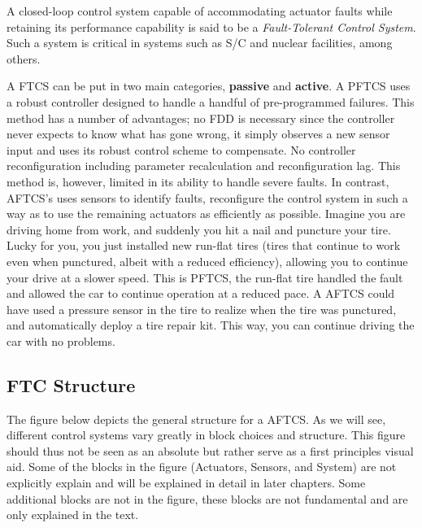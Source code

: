 A closed-loop control system capable of accommodating actuator faults while retaining its performance capability is said to be a \textit{Fault-Tolerant Control System}. Such a system is critical in systems such as \gls{S/C} and nuclear facilities, among others. 

A \gls{FTCS} can be put in two main categories, \textbf{passive} and \textbf{active}. A \gls{PFTCS} uses a robust controller designed to handle a handful of pre-programmed failures. This method has a number of advantages; no \gls{FDD} is necessary since the controller never expects to know what has gone wrong, it simply observes a new sensor input and uses its robust control scheme to compensate. No controller reconfiguration including parameter recalculation and reconfiguration lag. This method is, however, limited in its ability to handle severe faults. In contrast, \gls{AFTCS}'s uses sensors to identify faults, reconfigure the control system in such a way as to use the remaining actuators as efficiently as possible. 
Imagine you are driving home from work, and suddenly you hit a nail and puncture your tire. Lucky for you, you just installed new run-flat tires (tires that continue to work even when punctured, albeit with a reduced efficiency), allowing you to continue your drive at a slower speed. This is \gls{PFTCS}, the run-flat tire handled the fault and allowed the car to continue operation at a reduced pace. A \gls{AFTCS} could have used a pressure sensor in the tire to realize when the tire was punctured, and automatically deploy a tire repair kit. This way, you can continue driving the car with no problems. 

\subsection{FTC Structure}

The figure below  depicts the general structure for a \gls{AFTCS}. As we will see, different control systems vary greatly in block choices and structure. This figure should thus not be seen as an absolute but rather serve as a first principles visual aid.  Some of the blocks in the figure (Actuators, Sensors, and System)  are not explicitly explain and will be explained in detail in later chapters. Some additional blocks are not in the figure, these blocks are not fundamental and are only explained in the text. 

